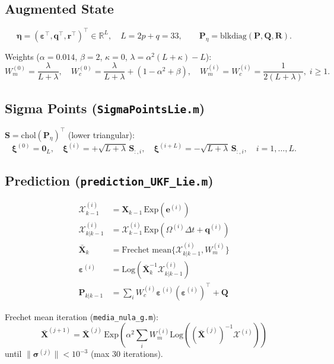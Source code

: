 \documentclass[11pt,a4paper]{article}
\theoremstyle{definition}
\theoremstyle{plain}
\newcommand{\Exp}{\mathrm{Exp}}
\newcommand{\Log}{\mathrm{Log}}
\newcommand{\bX}{\mathbf{X}}
\newcommand{\bP}{\mathbf{P}}
\newcommand{\bQ}{\mathbf{Q}}
\newcommand{\bR}{\mathbf{R}}
\begin{document}
\subsection{Augmented State}

\[
  \bm\eta = (\bm\varepsilon^\top, \mathbf{q}^\top, \mathbf{r}^\top)^\top \in\mathbb{R}^L,
  \quad L = 2p + q = 33,
  \qquad
  \mathbf{P}_\eta = \mathrm{blkdiag}(\bP,\bQ,\bR).
\]

Weights ($\alpha=0.014$, $\beta=2$, $\kappa=0$, $\lambda=\alpha^2(L+\kappa)-L$):
\[
  W_m^{(0)} = \frac{\lambda}{L+\lambda}, \quad
  W_c^{(0)} = \frac{\lambda}{L+\lambda} + (1-\alpha^2+\beta), \quad
  W_m^{(i)} = W_c^{(i)} = \frac{1}{2(L+\lambda)}, \; i\geq1.
\]

\subsection{Sigma Points (\texttt{SigmaPointsLie.m})}

$\mathbf{S} = \mathrm{chol}(\mathbf{P}_\eta)^\top$ (lower triangular):
\[
  \bm\xi^{(0)} = \mathbf{0}_L, \quad
  \bm\xi^{(i)} = +\sqrt{L+\lambda}\,\mathbf{S}_{:,i}, \quad
  \bm\xi^{(i+L)} = -\sqrt{L+\lambda}\,\mathbf{S}_{:,i}, \quad i=1,\ldots,L.
\]

\subsection{Prediction (\texttt{prediction\_UKF\_Lie.m})}

\begin{align}
  \mathcal{X}_{k-1}^{(i)} &= \bX_{k-1}\,\Exp(\bm{e}^{(i)}) \tag{lift}\\
  \mathcal{X}_{k|k-1}^{(i)} &= \mathcal{X}_{k-1}^{(i)}\,\Exp(\Omega^{(i)}\Delta t + \mathbf{q}^{(i)}) \tag{propagate}\\
  \bar{\mathbf{X}}_k &= \text{Frechet mean}\{\mathcal{X}_{k|k-1}^{(i)}, W_m^{(i)}\} \tag{mean}\\
  \bm\varepsilon^{(i)} &= \Log(\bar{\mathbf{X}}_k^{-1}\mathcal{X}_{k|k-1}^{(i)}) \tag{algebra errors}\\
  \bP_{k|k-1} &= \sum_i W_c^{(i)}\bm\varepsilon^{(i)}(\bm\varepsilon^{(i)})^\top + \bQ \tag{covariance}
\end{align}

Frechet mean iteration (\texttt{media\_nula\_g.m}):
\[
  \bar{\mathbf{X}}^{(j+1)} = \bar{\mathbf{X}}^{(j)}\,
  \Exp\!\!\left(\alpha^2\sum_{i} W_m^{(i)}\Log\!\left((\bar{\mathbf{X}}^{(j)})^{-1}
  \mathcal{X}^{(i)}\right)\right)
\]
until $\|\bm\sigma^{(j)}\|<10^{-3}$ (max 30 iterations).
\end{document}
